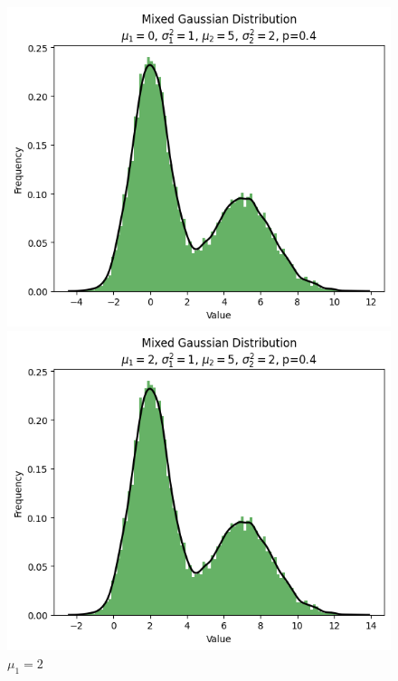 \documentclass{article}
\begin{document}
\begin{figure}[H]
    \hfill
    \begin{minipage}[b]{0.3\linewidth}
        \centering
        \includegraphics[width=\linewidth]{figure/mu_1=0.png}
        \caption{$\mu_1=0$}
    \end{minipage}
    \vspace{4mm} %
    \begin{minipage}[b]{0.3\linewidth}
        \centering
        \includegraphics[width=\linewidth]{figure/mu_1=2.png}
        \caption{$\mu_1=2$}
    \end{minipage}

\end{figure}
\end{document}
